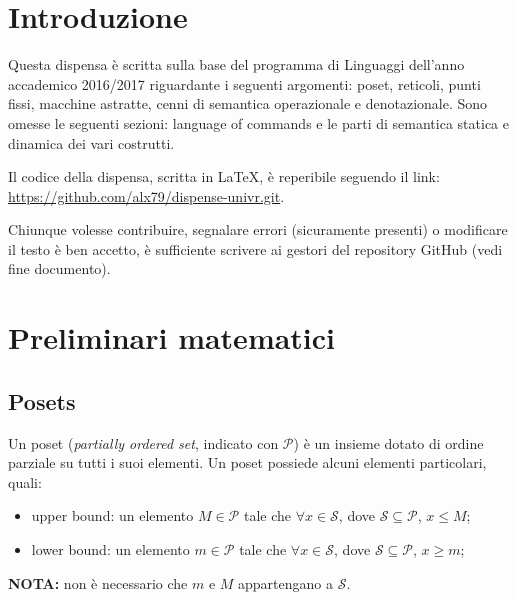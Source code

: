 \documentclass[a4paper, 10pt]{article}
\begin{document}
	\begin{frontespizio}
		\Preambolo{\usepackage{datetime}}
	\end{frontespizio}
	
	\tableofcontents
	
	\newpage
	
	\section{Introduzione}
	
	Questa dispensa è scritta sulla base del programma di Linguaggi dell'anno accademico 2016/2017
	riguardante i seguenti argomenti: poset, reticoli, punti fissi, macchine astratte, cenni di semantica 
	operazionale e denotazionale. Sono omesse le seguenti sezioni: language of commands e le parti di semantica statica e dinamica dei vari costrutti.
	
	\noindent
	Il codice della dispensa, scritta in \LaTeX, è reperibile seguendo il link: \\ \url{https://github.com/alx79/dispense-univr.git}.
	
	Chiunque volesse contribuire, segnalare errori (sicuramente presenti) o modificare il testo è ben accetto, è sufficiente scrivere ai gestori del repository GitHub (vedi fine documento).
	
	\section{Preliminari matematici}
	\subsection{Posets}
	
	Un poset (\textit{partially ordered set}, indicato con $\mathcal{P}$) è un insieme dotato di ordine parziale su tutti i suoi elementi. Un poset possiede alcuni elementi particolari, quali:
	\begin{itemize}
		\item upper bound: un elemento $M \in \mathcal{P}$ tale che $\forall x \in \mathcal{S}$, dove  $\mathcal{S} \subseteq \mathcal{P}$, $x \leq M$;
		\item lower bound: un elemento $m \in \mathcal{P}$ tale che $\forall x \in \mathcal{S}$, dove  $\mathcal{S} \subseteq \mathcal{P}$, $x \geq m$;
	\end{itemize}
	\textbf{NOTA:} non è necessario che $m$ e $M$ appartengano a $\mathcal{S}$. 
	
\end{document}
